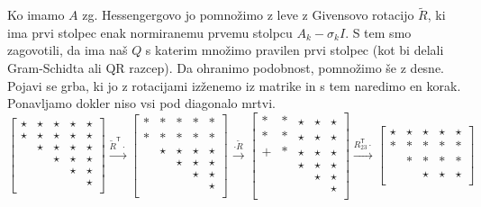 \documentclass[a4paper,10pt]{article}
\theoremstyle{definition}
\newcommand{\T}{\mathsf{T}\!}
\begin{document}
Ko imamo $A$ zg. Hessengergovo jo pomnožimo z leve z Givensovo rotacijo
$\tilde{R}$, ki ima
prvi stolpec enak normiranemu prvemu stolpcu $A_k - \sigma_kI$. S tem smo zagovotili, da ima naš $Q$ s
katerim množimo pravilen prvi stolpec (kot bi delali Gram-Schidta ali QR
razcep). Da ohranimo podobnost, pomnožimo še z desne. Pojavi se grba, ki jo z
rotacijami izženemo iz matrike in s tem naredimo en korak. Ponavljamo dokler
niso vsi pod diagonalo mrtvi.
\[
\begin{bmatrix}
  \star & \star & \star & \star & \star \\
  \star & \star & \star & \star & \star \\
        & \star & \star & \star & \star \\
        &       & \star & \star & \star \\
        &       &       & \star & \star \\
        &       &       &       & \star \\
\end{bmatrix}
\xrightarrow{\tilde{R}^\T\cdot}
\begin{bmatrix}
  * & * & * & * & * \\
  * & * & * & * & * \\
        & \star & \star & \star & \star \\
        &       & \star & \star & \star \\
        &       &       & \star & \star \\
        &       &       &       & \star \\
\end{bmatrix}
\xrightarrow{\cdot \tilde{R}}
\begin{bmatrix}
  * & * & \star & \star & \star \\
  * & * & \star & \star & \star \\
     +  & *     & \star & \star & \star \\
        &       & \star & \star & \star \\
        &       &       & \star & \star \\
        &       &       &       & \star \\
\end{bmatrix}
\xrightarrow{R_{23}^\T\cdot}
\begin{bmatrix}
  \star & \star & \star & \star & \star \\
  * & * & * & * & * \\
    & * & * & * & * \\
        &       & \star & \star & \star \\

\end{bmatrix}\]
\end{document}
